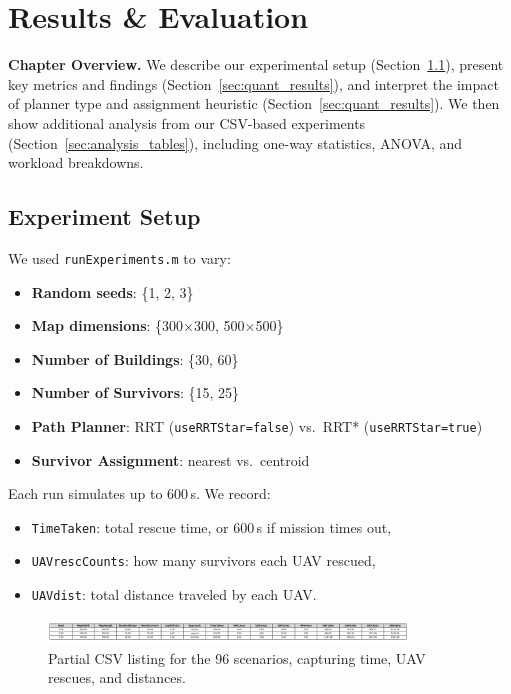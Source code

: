 \documentclass[12pt,a4paper]{report}
\begin{document}
\chapter{Results \& Evaluation}
\label{ch:results}

\textbf{Chapter Overview.} We describe our experimental setup (Section~\ref{sec:experiment_setup}),
present key metrics and findings (Section~\ref{sec:quant_results}), and interpret the impact
of planner type and assignment heuristic (Section~\ref{sec:quant_results}). We then show 
additional analysis from our CSV-based experiments (Section~\ref{sec:analysis_tables}), 
including one-way statistics, ANOVA, and workload breakdowns.

\section{Experiment Setup}
\label{sec:experiment_setup}
We used \texttt{runExperiments.m} to vary:
\begin{itemize}
    \item \textbf{Random seeds}: \{1, 2, 3\}
    \item \textbf{Map dimensions}: \{300$\times$300, 500$\times$500\}
    \item \textbf{Number of Buildings}: \{30, 60\}
    \item \textbf{Number of Survivors}: \{15, 25\}
    \item \textbf{Path Planner}: RRT (\texttt{useRRTStar=false}) vs.\ RRT* (\texttt{useRRTStar=true})
    \item \textbf{Survivor Assignment}: nearest vs.\ centroid
\end{itemize}
Each run simulates up to 600\,s. We record:
\begin{itemize}
    \item \texttt{TimeTaken}: total rescue time, or 600\,s if mission times out,
    \item \texttt{UAVrescCounts}: how many survivors each UAV rescued,
    \item \texttt{UAVdist}: total distance traveled by each UAV.
\end{itemize}

\begin{figure}[H]
\centering
\includegraphics[width=0.85\textwidth]{analysis/representative_runs.png} 
\caption{Partial CSV listing for the 96 scenarios, capturing time, UAV rescues, and distances.}
\label{fig:csvScreencap}
\end{figure}
\end{document}
